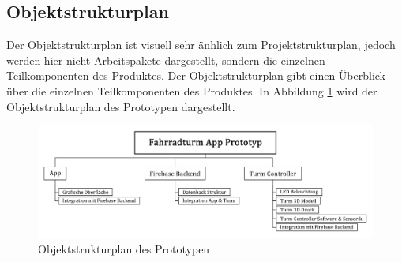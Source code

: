 \subsection{Objektstrukturplan}

Der Objektstrukturplan ist visuell sehr änhlich zum Projektstrukturplan, jedoch werden hier nicht Arbeitspakete dargestellt, sondern die einzelnen Teilkomponenten des Produktes. Der Objektstrukturplan gibt einen Überblick über die einzelnen Teilkomponenten des Produktes. In Abbildung \ref{fig:objektstrukturplan_prototyp} wird der Objektstrukturplan des Prototypen dargestellt. 

\begin{figure}[H]
    \centering
    \includegraphics[width=1\textwidth]{images/objektstrukturplan_prototyp}
    \caption{Objektstrukturplan des Prototypen}
    \label{fig:objektstrukturplan_prototyp}
\end{figure}
